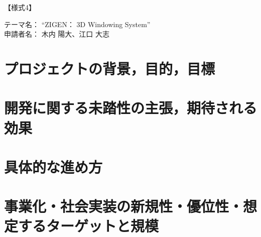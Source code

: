 \documentclass[uplatex]{jsarticle}
\begin{document}
\begin{flushright}
  【様式4】
\end{flushright}
テーマ名： ``ZIGEN： 3D Windowing System'' \\
申請者名： 木内 陽大、江口 大志


\section{プロジェクトの背景，目的，目標}



\section{開発に関する未踏性の主張，期待される効果}


\section{具体的な進め方}


\section{事業化・社会実装の新規性・優位性・想定するターゲットと規模}
\end{document}
